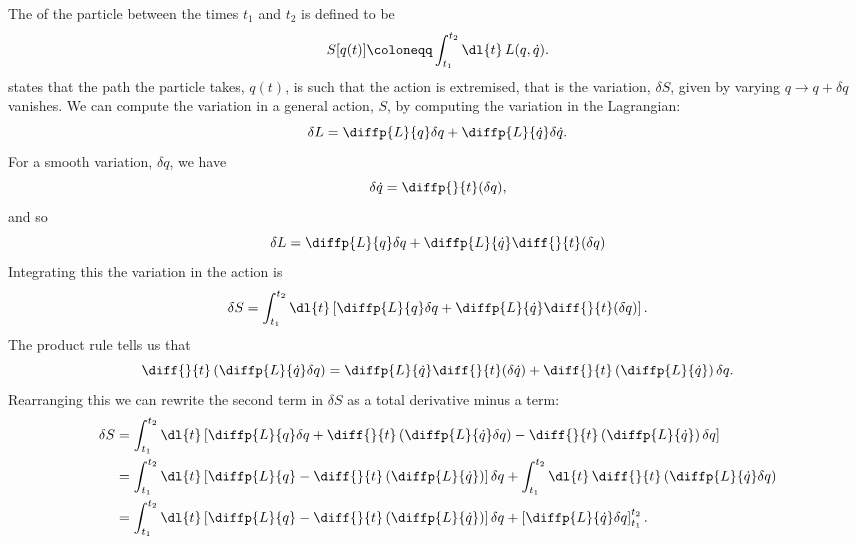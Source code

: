 \documentclass[fleqn]{NotesClass}
\newcommand{\lagrangian}{L}
\begin{document}
    The  of the particle between the times \(t_1\) and \(t_2\) is defined to be
    \begin{equation}
        S[q(t)] \coloneqq \int_{t_1}^{t_2} \dl{t} \, \lagrangian(q, \dot{q}).
    \end{equation}
     states that the path the particle takes, \(q(t)\), is such that the action is extremised, that is the variation, \(\delta S\), given by varying \(q \to q + \delta q\) vanishes.
    We can compute the variation in a general action, \(S\), by computing the variation in the Lagrangian:
    \begin{equation}
        \delta \lagrangian = \diffp{\lagrangian}{q} \delta q + \diffp{\lagrangian}{\dot{q}} \delta \dot{q}.
    \end{equation}
    For a smooth variation, \(\delta q\), we have
    \begin{equation}
        \delta \dot{q} = \diffp{}{t}(\delta q),
    \end{equation}
    and so
    \begin{equation}
        \delta \lagrangian = \diffp{\lagrangian}{q} \delta q + \diffp{\lagrangian}{\dot{q}} \diff{}{t} (\delta q)
    \end{equation}
    Integrating this the variation in the action is
    \begin{equation}
        \delta S = \int_{t_1}^{t_2} \dl{t} \left[ \diffp{\lagrangian}{q} \delta q + \diffp{\lagrangian}{\dot{q}} \diff{}{t} (\delta q) \right].
    \end{equation}
    The product rule tells us that
    \begin{equation}
        \diff{}{t}\left( \diffp{\lagrangian}{\dot{q}} \delta q \right) = \diffp{\lagrangian}{\dot{q}} \diff{}{t} (\delta \dot{q}) + \diff{}{t} \left( \diffp{\lagrangian}{\dot{q}} \right) \delta q.
    \end{equation}
    Rearranging this we can rewrite the second term in \(\delta S\) as a total derivative minus a term:
    \begin{align}
        \delta S &= \int_{t_1}^{t_2} \dl{t} \left[ \diffp{\lagrangian}{q} \delta q + \diff{}{t}\left( \diffp{\lagrangian}{\dot{q}} \delta q \right) - \diff{}{t}\left( \diffp{\lagrangian}{\dot{q}} \right) \delta q \right]\\
        &= \int_{t_1}^{t_2} \dl{t} \left[ \diffp{\lagrangian}{q} - \diff{}{t}\left( \diffp{\lagrangian}{\dot{q}} \right) \right] \delta q + \int_{t_1}^{t_2} \dl{t} \, \diff{}{t}\left( \diffp{\lagrangian}{\dot{q}} \delta q \right)\\
        &= \int_{t_1}^{t_2} \dl{t} \left[ \diffp{\lagrangian}{q} - \diff{}{t}\left( \diffp{\lagrangian}{\dot{q}} \right) \right] \delta q + \left[ \diffp{\lagrangian}{\dot{q}} \delta q \right]_{t_1}^{t_2}.
    \end{align}
\end{document}
